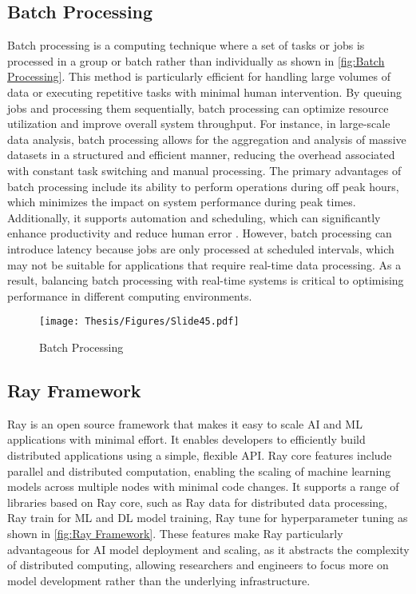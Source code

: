 \subsection{Batch Processing}
Batch processing is a computing technique where a set of tasks or jobs is processed in a group or batch rather than individually as shown in \autoref{fig:Batch Processing}. This method is particularly efficient for handling large volumes of data or executing repetitive tasks with minimal human intervention. By queuing jobs and processing them sequentially, batch processing can optimize resource utilization and improve overall system throughput. For instance, in large-scale data analysis, batch processing allows for the aggregation and analysis of massive datasets in a structured and efficient manner, reducing the overhead associated with constant task switching and manual processing. The primary advantages of batch processing include its ability to perform operations during off peak hours, which minimizes the impact on system performance during peak times. Additionally, it supports automation and scheduling, which can significantly enhance productivity and reduce human error \cite{silberschatz2011database}. However, batch processing can introduce latency because jobs are only processed at scheduled intervals, which may not be suitable for applications that require real-time data processing. As a result, balancing batch processing with real-time systems is critical to optimising performance in different computing environments. \cite{tanenbaum2009modern}

\captionsetup{justification=centering}
\begin{figure}[h]
\centering
\texttt{[image: Thesis/Figures/Slide45.pdf]}
\caption{\label{fig:Batch Processing}Batch Processing \cite{batch_processing_os}}
\end{figure}

\subsection{Ray Framework}

Ray is an open source framework that makes it easy to scale AI and ML applications with minimal effort. It enables developers to efficiently build distributed applications using a simple, flexible API. Ray core features include parallel and distributed computation, enabling the scaling of machine learning models across multiple nodes with minimal code changes. It supports a range of libraries based on Ray core, such as Ray data for distributed data processing, Ray train for ML and DL model training, Ray tune for hyperparameter tuning as shown in \autoref{fig:Ray Framework}. These features make Ray particularly advantageous for AI model deployment and scaling, as it abstracts the complexity of distributed computing, allowing researchers and engineers to focus more on model development rather than the underlying infrastructure. \cite{anyscale_blog}

